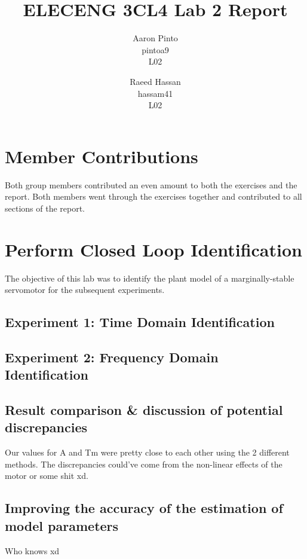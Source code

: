 \documentclass[12pt]{article}
\title{ELECENG 3CL4 Lab 2 Report}
\author{
    Aaron Pinto \\
    pintoa9 \\
    L02
    \and
    Raeed Hassan \\
    hassam41 \\
    L02
}
\begin{document}
\maketitle
\clearpage

\setcounter{section}{2}
\section{Member Contributions}
Both group members contributed an even amount to both the exercises and the report. Both members went through the exercises together and contributed to all sections of the report.

\section{Perform Closed Loop Identification}
The objective of this lab was to identify the plant model of a marginally-stable servomotor for the subsequent experiments.

\subsection{Experiment 1: Time Domain Identification}

\subsection{Experiment 2: Frequency Domain Identification}

\subsection{Result comparison & discussion of potential discrepancies}
Our values for A and Tm were pretty close to each other using the 2 different methods. The discrepancies could've come from the non-linear effects of the motor or some shit xd.

\subsection{Improving the accuracy of the estimation of model parameters}
Who knows xd
\end{document}
